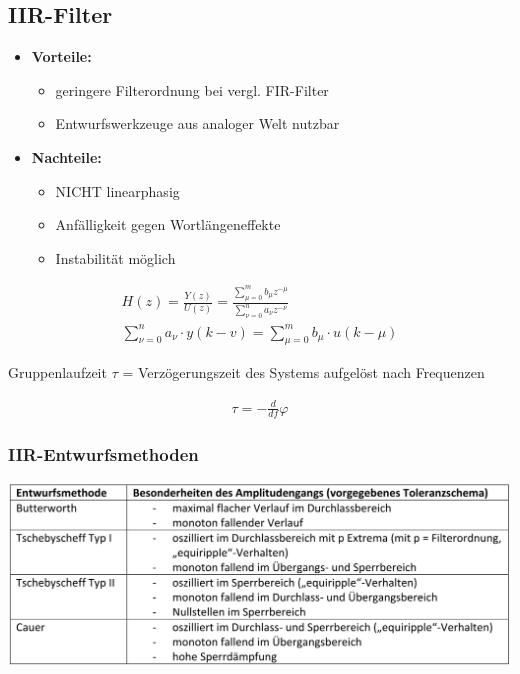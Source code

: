 \documentclass[10pt,a4paper]{article}
\begin{document}
\subsection{IIR-Filter}
\begin{itemize}
  \item \textbf{Vorteile: }
    \begin{itemize}
     \item geringere Filterordnung bei vergl. FIR-Filter
     \item Entwurfswerkzeuge aus analoger Welt nutzbar
     \end{itemize}
  \item \textbf{Nachteile: }
    \begin{itemize}
    \item NICHT linearphasig
    \item Anfälligkeit gegen Wortlängeneffekte 
    \item Instabilität möglich
    \end{itemize}
\end{itemize}
  \begin{mdframed}[style=exercise]
    \begin{align}
        H(z)=\frac{Y(z)}{U(z)}= \frac{\sum_{\mu=0}^{m} b_\mu z^{-\mu}}{\sum_{\nu=0}^{n} a_\nu z^{-\nu}}\\
        \sum_{\nu=0}^{n}a_{\nu}\cdot y(k-v) = \sum_{\mu=0}^{m}b_{\mu}\cdot u(k-\mu)
    \end{align}
  \end{mdframed}
Gruppenlaufzeit $\tau$ = Verzögerungszeit des Systems aufgelöst nach Frequenzen
  \begin{mdframed}[style=exercise]
    \begin{align}
        \tau = -\frac{d}{df}\varphi
    \end{align}
  \end{mdframed}
\subsubsection{IIR-Entwurfsmethoden}
  \begin{center}
      \includegraphics[width=.5\textwidth]{./img/entwurf.png}
  \end{center}
\end{document}
